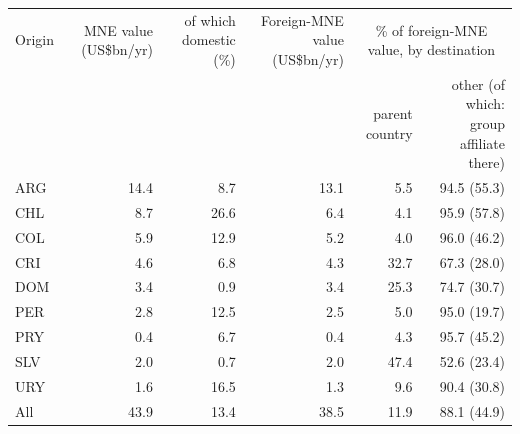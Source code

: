 \begin{tabular}{lrrrrr}
\toprule
Origin & MNE value (US\$bn/yr) & of which domestic (\%) & Foreign-MNE value (US\$bn/yr) & \multicolumn{2}{c}{\% of foreign-MNE value, by destination} \\
 & & & & parent country & other (of which: group affiliate there) \\
\midrule
ARG & 14.4 & 8.7 & 13.1 & 5.5 & 94.5 (55.3) \\
CHL & 8.7 & 26.6 & 6.4 & 4.1 & 95.9 (57.8) \\
COL & 5.9 & 12.9 & 5.2 & 4.0 & 96.0 (46.2) \\
CRI & 4.6 & 6.8 & 4.3 & 32.7 & 67.3 (28.0) \\
DOM & 3.4 & 0.9 & 3.4 & 25.3 & 74.7 (30.7) \\
PER & 2.8 & 12.5 & 2.5 & 5.0 & 95.0 (19.7) \\
PRY & 0.4 & 6.7 & 0.4 & 4.3 & 95.7 (45.2) \\
SLV & 2.0 & 0.7 & 2.0 & 47.4 & 52.6 (23.4) \\
URY & 1.6 & 16.5 & 1.3 & 9.6 & 90.4 (30.8) \\
\midrule
All & 43.9 & 13.4 & 38.5 & 11.9 & 88.1 (44.9) \\
\bottomrule
\end{tabular}
